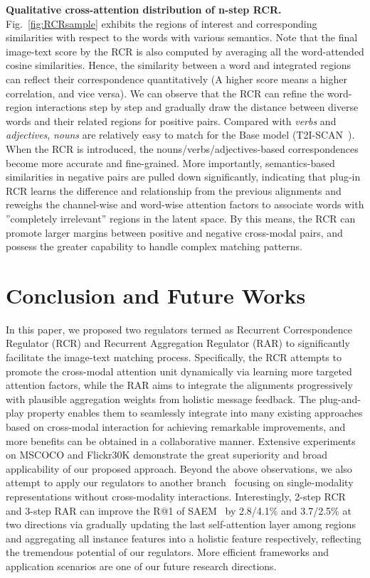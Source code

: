 \documentclass[journal]{IEEEtran}\newcommand{\ignore}[1]{}
\begin{document}
\textbf{Qualitative cross-attention distribution of n-step RCR.}
Fig.~\ref{fig:RCRsample} exhibits the regions of interest and corresponding similarities with respect to the words with various semantics. Note that the final image-text score by the RCR is also computed by averaging all the word-attended cosine similarities. Hence, the similarity between a word and integrated regions can reflect their correspondence quantitatively (A higher score means a higher correlation, and vice versa). We can observe that the RCR can refine the word-region interactions step by step and gradually draw the distance between diverse words and their related regions for positive pairs. Compared with \textit{verbs} and \textit{adjectives}, \textit{nouns} are relatively easy to match for the Base model (T2I-SCAN~\cite{SCAN}). When the RCR is introduced, the nouns/verbs/adjectives-based correspondences become more accurate and fine-grained. More importantly, semantics-based similarities in negative pairs are pulled down significantly, indicating that plug-in RCR learns the difference and relationship from the previous alignments and reweighs the channel-wise and word-wise attention factors to associate words with ”completely irrelevant” regions in the latent space. By this means, the RCR can promote larger margins between positive and negative cross-modal pairs, and possess the greater capability to handle complex matching patterns.

\section{Conclusion and Future Works}
In this paper, we proposed two regulators termed as Recurrent Correspondence Regulator (RCR) and Recurrent Aggregation Regulator (RAR) to significantly facilitate the image-text matching process. Specifically, the RCR attempts to promote the cross-modal attention unit dynamically via learning more targeted attention factors, while the RAR aims to integrate the alignments progressively with plausible aggregation weights from holistic message feedback. 
The plug-and-play property enables them to seamlessly integrate into many existing approaches based on cross-modal interaction for achieving remarkable improvements, and more benefits can be obtained in a collaborative manner. 
Extensive experiments on MSCOCO and Flickr30K demonstrate the great superiority and broad applicability of our proposed approach.
Beyond the above observations, we also attempt to apply our regulators to another branch~\cite{VSE++,VSRN,SAEM,GPO} focusing on single-modality representations without cross-modality interactions. Interestingly, 2-step RCR and 3-step RAR can improve the R@1 of SAEM~\cite{SAEM} by 2.8/4.1\% and 3.7/2.5\% at two directions via gradually updating the last self-attention layer among regions and aggregating all instance features into a holistic feature respectively, reflecting the tremendous potential of our regulators. More efficient frameworks and application scenarios are one of our future research directions.
\ifCLASSOPTIONcaptionsoff
  \newpage
\fi


\end{document}
